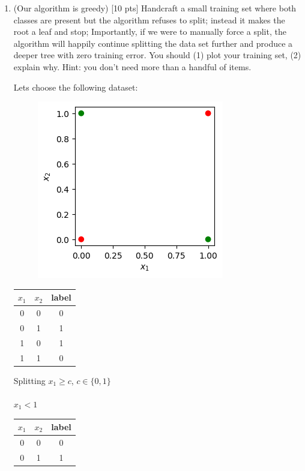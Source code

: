 \documentclass[a4paper]{article}
\theoremstyle{definition}
\newenvironment{soln}{
    \leavevmode\color{blue}\ignorespaces
}{}
\begin{document}
\begin{enumerate}
\item (Our algorithm is greedy)  [10 pts] Handcraft a small training set where both classes are present but the algorithm refuses to split; instead it makes the root a leaf and stop;
Importantly, if we were to manually force a split, the algorithm will happily continue splitting the data set further and produce a deeper tree with zero training error.
You should (1) plot your training set, (2) explain why.  Hint: you don't need more than a handful of items. \\
\begin{soln}
    Lets choose the following dataset:\\
    \begin{minipage}{0.4\linewidth}
        \begin{figure}[H]
            \centering
            \includegraphics[scale=0.5]{Images/Q2/DTq2.png}
            \label{fig:q2}
        \end{figure}
    \end{minipage}
    \begin{minipage}{0.3\linewidth}
        \centering
        \large
        \begin{tabular}{|c|c|c|}
            \hline
            $x_1$ & $x_2$ & label \\
            \hline
            0 & 0 & 0 \\
            0 & 1 & 1 \\
            1 & 0 & 1 \\
            1 & 1 & 0 \\
            \hline
        \end{tabular}
    \end{minipage}
    \begin{minipage}{0.3\linewidth}
        Splitting $x_1\geq c$, $c\in\{0,1\}$\\\\
        $x_1 < 1$\\
        \begin{tabular}{|c|c|c|}
            \hline
            $x_1$ & $x_2$ & label \\
            \hline
            0 & 0 & 0 \\
            0 & 1 & 1 \\
            \hline
        \end{tabular}\\


\end{minipage}
\end{soln}
\end{enumerate}
\end{document}
